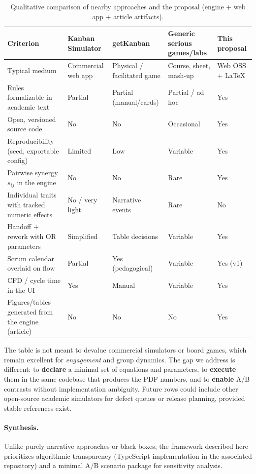 \begin{table}[htbp]
  \centering
  \caption{Qualitative comparison of nearby approaches and the proposal (engine + web app + article artifacts).}
  \label{tab:comparacaoSoftware}
  \small
  \setlength{\tabcolsep}{3pt}
  \begin{tabular}{@{}>{\raggedright\arraybackslash}p{3.15cm}>{\centering\arraybackslash}p{2.35cm}>{\centering\arraybackslash}p{2.35cm}>{\centering\arraybackslash}p{2.35cm}>{\centering\arraybackslash}p{2.85cm}@{}}
    \toprule
    Criterion & Kanban Simulator\newline\cite{kanbanSimulator} & getKanban\newline\cite{getkanban} & Generic serious games\newline/labs & This proposal \\
    \midrule
    Typical medium & Commercial web app & Physical / facilitated game & Course, sheet, mash-up & Web OSS + \LaTeX{} \\
    Rules formalizable in academic text & Partial & Partial (manual/cards) & Partial / ad hoc & Yes \\
    Open, versioned source code & No & No & Occasional & Yes \\
    Reproducibility (seed, exportable config) & Limited & Low & Variable & Yes \\
    Pairwise synergy $s_{ij}$ in the engine & No & No & Rare & Yes \\
    Individual traits with tracked numeric effects & No / very light & Narrative events & Rare & No \\
    Handoff + rework with OR parameters & Simplified & Table decisions & Variable & Yes \\
    Scrum calendar overlaid on flow & Partial & Yes (pedagogical) & Variable & Yes (v1) \\
    CFD / cycle time in the UI & Yes & Manual & Variable & Yes \\
    Figures/tables generated from the engine (article) & No & No & No & Yes \\
    \bottomrule
  \end{tabular}
\end{table}

The table is not meant to devalue commercial simulators or board games, which remain excellent for \emph{engagement} and group dynamics. The gap we address is different: to \textbf{declare} a minimal set of equations and parameters, to \textbf{execute} them in the same codebase that produces the PDF numbers, and to \textbf{enable} A/B contrasts without implementation ambiguity. Future rows could include other open-source academic simulators for defect queues or release planning, provided stable references exist.

\paragraph{Synthesis.}
Unlike purely narrative approaches or black boxes, the framework described here prioritizes algorithmic transparency (TypeScript implementation in the associated repository) and a minimal A/B scenario package for sensitivity analysis.
